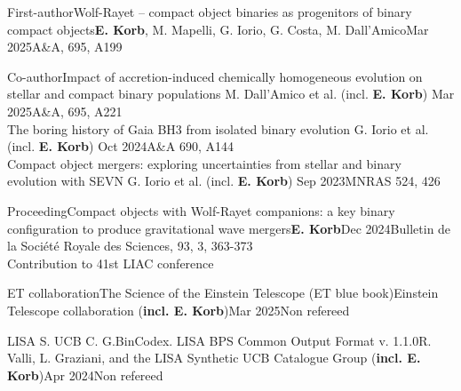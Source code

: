 %
%
%

\begin{experiences}
    \publicationtags
    {First-author}{Wolf-Rayet -- compact object binaries as progenitors of binary compact objects}{\textbf{E. Korb}, M. Mapelli, G. Iorio, G. Costa, M. Dall'Amico}{Mar 2025}{A\&A, 695, A199 }{}
    \emptySeparator

    \publicationtags
    {Co-author}{Impact of accretion-induced chemically homogeneous evolution on stellar and compact binary populations}
    {M. Dall'Amico et al. (incl. \textbf{E. Korb})}
    {Mar 2025}{A\&A, 695, A221}
    {} 
    \\
    \bigskip
    \publicationtags
    {}{The boring history of Gaia BH3 from isolated binary evolution}
    {G. Iorio et al. (incl. \textbf{E. Korb})}
    {Oct 2024}{A\&A 690, A144}
    {} 
    \\
    \bigskip
    \publicationtags
    {}{Compact object mergers: exploring uncertainties from stellar and binary evolution with SEVN}
    {G. Iorio et al. (incl. \textbf{E. Korb})}
    {Sep 2023}{MNRAS 524, 426}
    {}    
    \emptySeparator
    
    \publicationtags
    {Proceeding}{Compact objects with Wolf-Rayet companions: a key binary configuration to produce gravitational wave mergers}{\textbf{E. Korb}}{Dec 2024}{Bulletin de la Société Royale des Sciences, 93, 3, 363-373 \\ Contribution to 41st LIAC conference}{}
    \emptySeparator
    
    \publicationtags
    {ET collaboration}{The Science of the Einstein Telescope (ET blue book)}{Einstein Telescope collaboration (\textbf{incl. E. Korb})}{Mar 2025}{Non refereed}{}
    \emptySeparator
    
    \publicationtags
    {LISA S. UCB C. G.}{BinCodex. LISA BPS Common Output Format v. 1.1.0}{R. Valli, L. Graziani, and the LISA Synthetic UCB Catalogue Group (\textbf{incl. E. Korb})}{Apr 2024}{Non refereed}{}
\end{experiences}